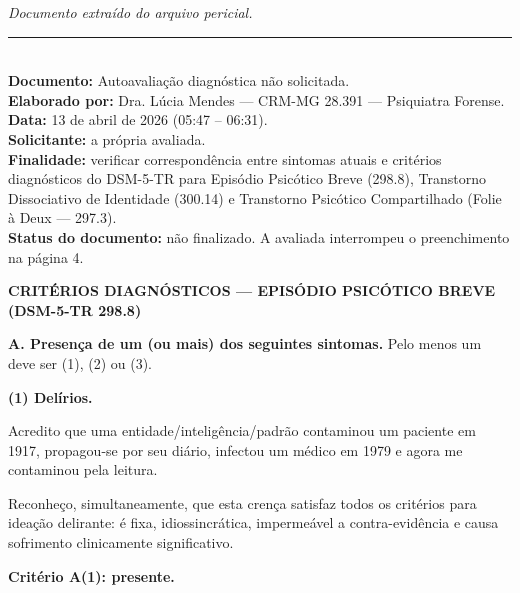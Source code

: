 
\noindent \textit{Documento extraído do arquivo pericial.}

\vspace{0.5em}\noindent\rule{\textwidth}{0.5pt}\vspace{0.5em}

\\[-0.2em]

\noindent\textbf{Documento:} Autoavaliação diagnóstica não solicitada.\\
\noindent \textbf{Elaborado por:} Dra. Lúcia Mendes — CRM-MG 28.391 — Psiquiatra Forense.\\
\noindent\textbf{Data:} 13 de abril de 2026 (05:47 -- 06:31).\\
\noindent \textbf{Solicitante:} a própria avaliada.\\
\noindent \textbf{Finalidade:} verificar correspondência entre sintomas atuais e critérios
\noindent diagnósticos do DSM-5-TR para Episódio Psicótico Breve (298.8),
\noindent Transtorno Dissociativo de Identidade (300.14) e Transtorno Psicótico
\noindent Compartilhado (Folie à Deux — 297.3).\\
\noindent \textbf{Status do documento:} não finalizado. A avaliada interrompeu o
\noindent preenchimento na página 4.

\noindent \textbf{CRITÉRIOS DIAGNÓSTICOS --- EPISÓDIO PSICÓTICO BREVE (DSM-5-TR 298.8)}

\textbf{A. Presença de um (ou mais) dos seguintes sintomas.}
\noindent Pelo menos um deve ser (1), (2) ou (3).

\noindent \textbf{(1) Delírios.}

\noindent Acredito que uma entidade\slash inteligência\slash padrão
\noindent contaminou um paciente em 1917, propagou-se por seu diário,
\noindent infectou um médico em 1979 e agora me contaminou pela leitura.

\noindent Reconheço, simultaneamente, que esta crença satisfaz
\noindent todos os critérios para ideação delirante: é fixa, idiossincrática,
\noindent impermeável a contra-evidência e causa sofrimento clinicamente significativo.

\noindent \textbf{Critério A(1): presente.}

